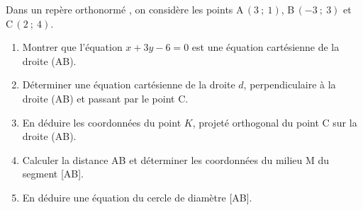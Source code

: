 \bigskip

Dans un repère orthonormé \Oij{}, on considère les points A\,$(3~;~1)$, B\,$(-3~;~3)$ et C\,$(2~;~4)$.

\begin{enumerate}
\item Montrer que l'équation $x + 3y - 6 = 0$ est une équation cartésienne de la droite (AB).
\item Déterminer une équation cartésienne de la droite $d$, perpendiculaire à la droite (AB) et
passant par le point C.
\item En déduire les coordonnées du point $K$, projeté orthogonal du point C sur la droite (AB).
\item Calculer la distance AB et déterminer les coordonnées du milieu M du segment [AB].
\item En déduire une équation du cercle de diamètre [AB].
\end{enumerate}
